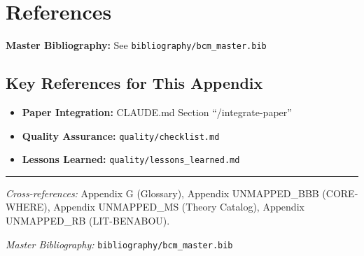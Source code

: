 \section{References}
\label{sec:paperint-references}

\begin{tcolorbox}[colback=blue!5!white, colframe=blue!75!black]
\textbf{Master Bibliography:} See \texttt{bibliography/bcm\_master.bib}
\end{tcolorbox}

\subsection{Key References for This Appendix}

\begin{itemize}[nosep]
    \item \textbf{Paper Integration:} CLAUDE.md Section ``/integrate-paper''
    \item \textbf{Quality Assurance:} \texttt{quality/checklist.md}
    \item \textbf{Lessons Learned:} \texttt{quality/lessons\_learned.md}
\end{itemize}

\nocite{bcm_master}

\vspace{1em}
\hrule
\vspace{0.5em}

\noindent\textit{Cross-references:}
Appendix G (Glossary),
Appendix UNMAPPED_BBB (CORE-WHERE),
Appendix UNMAPPED_MS (Theory Catalog),
Appendix UNMAPPED_RB (LIT-BENABOU).

\noindent\textit{Master Bibliography:} \texttt{bibliography/bcm\_master.bib}


